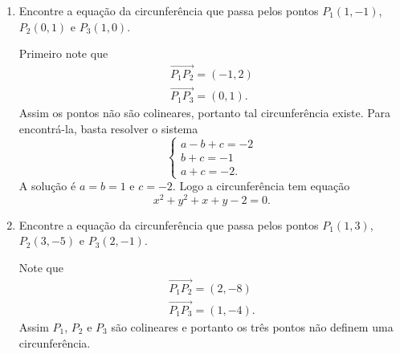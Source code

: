 \begin{exemplos}
\begin{enumerate}
\begin{solucao}
      Agora, como
      \[
        -2x_0 = a,\quad -2y_0 = b,\quad x_0^2 + y_0^2 - r^2 = c
      \]
      segue que
      \[
        x_0 = 13/2,\quad y_0 = -1/2 \quad\mbox{e}\quad r^2 = 65/2.
      \]
      Assim a equação cartesiana da circunferência ser\'a
    \[
      \left(x - \dfrac{13}{2}\right)^2 + \left(y + \dfrac{1}{2}\right)^2 = \dfrac{65}{2}.
    \]
    As equações paramétricas são
    \[
      \begin{cases}
        x = \dfrac{13}{2} + \dfrac{\sqrt{65}}{\sqrt{2}}\cos\beta\\
        y = -\dfrac{1}{2} + \dfrac{\sqrt{65}}{\sqrt{2}}\sin\beta\\
      \end{cases}, \beta \in [0,2\pi].
    \]
    \end{solucao}
    \item Encontre a equação da circunferência que passa pelos pontos $P_1(1,-1)$, $P_2(0,1)$ e $P_3(1,0)$.
    \begin{solucao}
      Primeiro note que
      \begin{align*}
        \vec{P_1P_2} = (-1,2)\\
        \vec{P_1P_3} = (0,1).
      \end{align*}
      Assim os pontos não são colineares, portanto tal circunferência existe. Para encontr\'a-la, basta resolver o sistema
      \[
        \begin{cases}
          a - b + c = -2\\
          b + c = -1\\
          a + c = -2.
        \end{cases}
      \]
      A solução é $a = b = 1$ e $c = -2$. Logo a circunferência tem equação
      \[
        x^2 + y^2 + x + y - 2 = 0.
      \]
    \end{solucao}
    \item Encontre a equação da circunferência que passa pelos pontos $P_1(1,3)$, $P_2(3,-5)$ e $P_3(2,-1)$.
    \begin{solucao}
      Note que
      \begin{align*}
        \vec{P_1P_2} = (2, -8)\\
        \vec{P_1P_3} = (1, -4).
      \end{align*}
      Assim $P_1$, $P_2$ e $P_3$ são colineares e portanto os três pontos não definem uma circunferência.
    \end{solucao}
  \end{enumerate}
\end{exemplos}

